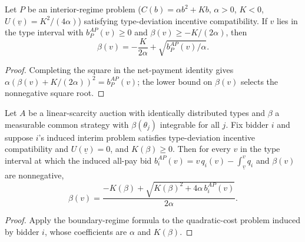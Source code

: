 \begin{theorem}\label{thm:MathEconLib.InteriorRegimeProblem.interior_regime_strategy}
\leanok
{}
Let $P$ be an interior-regime problem ($C(b) = \alpha b^2 + K b$, $\alpha > 0$, $K < 0$, $U(\underline v) = K^2/(4\alpha)$) satisfying type-deviation incentive compatibility. If $v$ lies in the type interval with $b^{AP}_P(v) \ge 0$ and $\beta(v) \ge -K/(2\alpha)$, then
\[
  \beta(v) = -\frac{K}{2\alpha} + \sqrt{b^{AP}_P(v)/\alpha}.
\]
\end{theorem}
\begin{proof}
\leanok
{}
Completing the square in the net-payment identity gives $\alpha(\beta(v) + K/(2\alpha))^2 = b^{AP}_P(v)$; the lower bound on $\beta(v)$ selects the nonnegative square root.
\end{proof}

\begin{theorem}\label{thm:MathEconLib.LinearScarcityAuction.boundary_regime_strategy_auction}
\leanok
{}
Let $A$ be a linear-scarcity auction with identically distributed types and $\beta$ a measurable common strategy with $\beta(\theta_j)$ integrable for all $j$. Fix bidder $i$ and suppose $i$'s induced interim problem satisfies type-deviation incentive compatibility and $U(\underline v) = 0$, and $K(\beta) \ge 0$. Then for every $v$ in the type interval at which the induced all-pay bid $b^{AP}_i(v) = v\,q_i(v) - \int_{\underline v}^v q_i$ and $\beta(v)$ are nonnegative,
\[
  \beta(v) = \frac{-K(\beta) + \sqrt{K(\beta)^2 + 4\alpha\, b^{AP}_i(v)}}{2\alpha}.
\]
\end{theorem}
\begin{proof}
\leanok
{}
Apply the boundary-regime formula to the quadratic-cost problem induced by bidder $i$, whose coefficients are $\alpha$ and $K(\beta)$.
\end{proof}

